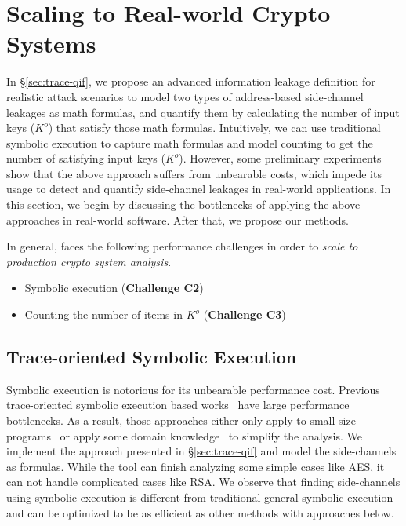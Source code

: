 \section{Scaling to Real-world Crypto Systems}
\label{sec:scala}

In \S\ref{sec:trace-qif}, we propose an advanced information leakage definition for
realistic attack scenarios to model two types of address-based side-channel
leakages as math formulas, and quantify them by calculating the number of input
keys ($K^o$) that satisfy those math formulas. Intuitively, we can use
traditional symbolic execution to capture math formulas and model counting
to get the number of satisfying input keys ($K^o$). However, some preliminary
experiments show that the above approach suffers from unbearable costs, which
impede its usage to detect and quantify side-channel leakages in real-world
applications. In this section, we begin by discussing the bottlenecks of
applying the above approaches in real-world software. After that, we
propose our methods.

In general, \tool{} faces the following performance challenges in
order to \emph{scale to production crypto system analysis}.
\begin{itemize}
      \item Symbolic execution (\textbf{Challenge C2})
      \item Counting the number of items in $K^o$ (\textbf{Challenge C3})
\end{itemize}

\subsection{Trace-oriented Symbolic Execution}
Symbolic execution is notorious for its unbearable performance cost. 
Previous trace-oriented
symbolic execution based
works~\cite{203878,Chattopadhyay:2017:QIL:3127041.3127044} have large
performance bottlenecks. As a result, those approaches either only apply to
small-size programs~\cite{Chattopadhyay:2017:QIL:3127041.3127044} or apply some
domain knowledge~\cite{Wang:2007:NCD:1250662.1250723} to simplify the analysis. 
We implement
the approach presented in \S\ref{sec:trace-qif} and model the side-channels as
formulas. While the tool can finish analyzing some simple cases like AES, it can
not handle complicated cases like RSA.
We observe that finding side-channels using symbolic execution is different from
traditional general symbolic execution and can be optimized to be as efficient
as other methods with approaches below.

